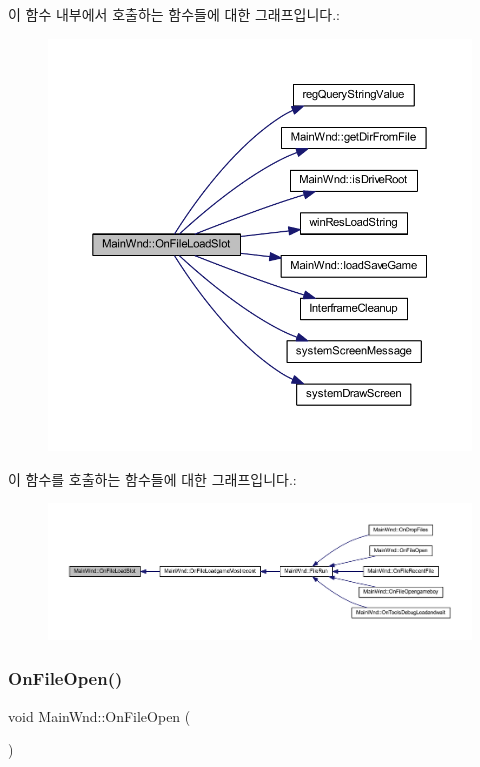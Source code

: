 이 함수 내부에서 호출하는 함수들에 대한 그래프입니다.\+:
\nopagebreak
\begin{figure}[H]
\begin{center}
\leavevmode
\includegraphics[width=350pt]{class_main_wnd_a84c4154350bd26b393fcd82948d342e1_cgraph}
\end{center}
\end{figure}
이 함수를 호출하는 함수들에 대한 그래프입니다.\+:
\nopagebreak
\begin{figure}[H]
\begin{center}
\leavevmode
\includegraphics[width=350pt]{class_main_wnd_a84c4154350bd26b393fcd82948d342e1_icgraph}
\end{center}
\end{figure}
\mbox{\label{class_main_wnd_ad60908c1c8c44204ea3c87c1109fa468}} 
\subsubsection{\texorpdfstring{On\+File\+Open()}{OnFileOpen()}}
{\footnotesize\ttfamily void Main\+Wnd\+::\+On\+File\+Open (\begin{DoxyParamCaption}{ }\end{DoxyParamCaption})\hspace{0.3cm}{\ttfamily [protected]}}



